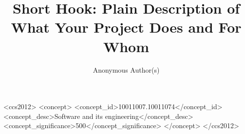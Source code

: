 \documentclass[acmsmall,screen,review,anonymous]{acmart}
\begin{document}
\title[Short Hook]{Short Hook: Plain Description of What Your Project Does and For Whom}

\author{Anonymous Author(s)}

\begin{abstract}

\end{abstract}

\begin{CCSXML}
<ccs2012>
  <concept>
    <concept_id>10011007.10011074</concept_id>
    <concept_desc>Software and its engineering</concept_desc>
    <concept_significance>500</concept_significance>
  </concept>
</ccs2012>
\end{CCSXML}


\maketitle













\end{document}
